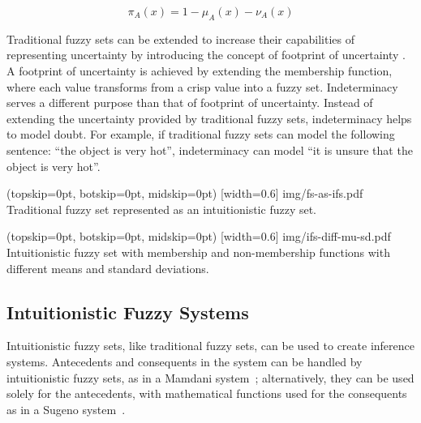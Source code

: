 ﻿\documentclass{ieeeaccess}
\begin{document}
\begin{equation}
  \label{eq:indeterminacy}
  \pi_{A}(x) = 1 - \mu_{A}(x) - \nu_{A}(x)
\end{equation}

Traditional fuzzy sets can be extended to increase their capabilities of
representing uncertainty by introducing the concept of footprint of
uncertainty \cite{Mendel2002} \cite{Mendel2006}. 
A footprint of uncertainty is achieved by extending the membership
function, where each value transforms from a crisp value into a fuzzy set.
Indeterminacy serves a different purpose than that of footprint
of uncertainty. %
Instead of extending the uncertainty provided by traditional
fuzzy sets, indeterminacy helps to model doubt. For example, if traditional
fuzzy sets can model the following sentence: ``the object is very hot'',
indeterminacy can model ``it is unsure that the object is very hot''.

\Figure[](topskip=0pt, botskip=0pt, midskip=0pt)
[width=0.6\linewidth]
{img/fs-as-ifs.pdf}
{Traditional fuzzy set represented as an intuitionistic fuzzy set.
  \label{figure:fs-as-ifs}}

\Figure[](topskip=0pt, botskip=0pt, midskip=0pt)
[width=0.6\linewidth]
{img/ifs-diff-mu-sd.pdf}
{Intuitionistic fuzzy set with membership and non-membership functions with different means and standard deviations.
  \label{figure:ifs-diff-mu-sd}}

\subsection{Intuitionistic Fuzzy Systems}
\label{subsection:intuitionistic-fuzzy-systems}

Intuitionistic fuzzy sets, like traditional fuzzy sets, can be used to create
inference systems. Antecedents and consequents in the system can be handled by
intuitionistic fuzzy sets, as in a Mamdani system~\cite{Mamdani1975}; alternatively, they can be used solely for
the antecedents, with mathematical functions used for the consequents as in a
Sugeno system~\cite{Takagi1985}.
\end{document}
